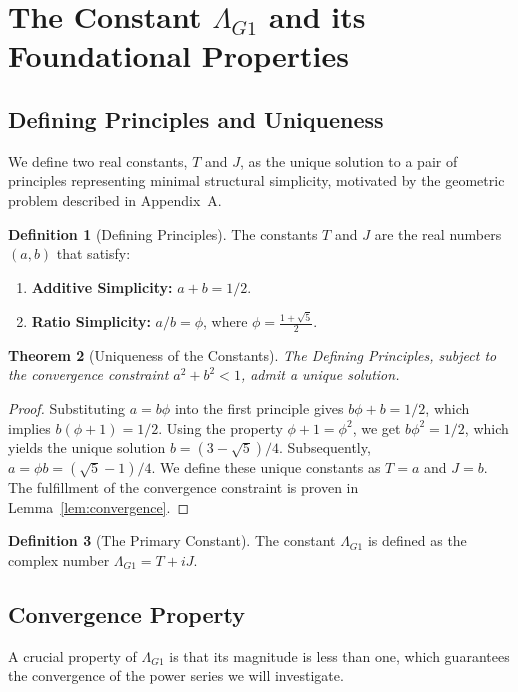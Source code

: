 \documentclass{amsart}
\theoremstyle{plain}
\newtheorem{theorem}{Theorem}[section]
\theoremstyle{definition}
\newtheorem{definition}[theorem]{Definition}
\theoremstyle{remark}
\newcommand{\LambdaG}{\Lambda_{G1}}
\begin{document}
\section{The Constant \texorpdfstring{$\Lambda_{G1}$}{Lambda\_G1} and its Foundational Properties}

\subsection{Defining Principles and Uniqueness}
We define two real constants, $T$ and $J$, as the unique solution to a pair of principles representing minimal structural simplicity, motivated by the geometric problem described in Appendix~A.

\begin{definition}[Defining Principles]
The constants $T$ and $J$ are the real numbers $(a,b)$ that satisfy:
\begin{enumerate}
    \item \textbf{Additive Simplicity:} $a+b = 1/2$.
    \item \textbf{Ratio Simplicity:} $a/b = \phi$, where $\phi = \frac{1+\sqrt{5}}{2}$.
\end{enumerate}
\end{definition}

\begin{theorem}[Uniqueness of the Constants]
The Defining Principles, subject to the convergence constraint $a^2+b^2 < 1$, admit a unique solution.
\end{theorem}
\begin{proof}
Substituting $a=b\phi$ into the first principle gives $b\phi+b=1/2$, which implies $b(\phi+1)=1/2$. Using the property $\phi+1=\phi^2$, we get $b\phi^2=1/2$, which yields the unique solution $b=(3-\sqrt{5})/4$. Subsequently, $a=\phi b = (\sqrt{5}-1)/4$. We define these unique constants as $T=a$ and $J=b$. The fulfillment of the convergence constraint is proven in Lemma~\ref{lem:convergence}.
\end{proof}

\begin{definition}[The Primary Constant]
The constant $\LambdaG$ is defined as the complex number $\LambdaG = T+iJ$.
\end{definition}

\subsection{Convergence Property}
A crucial property of $\LambdaG$ is that its magnitude is less than one, which guarantees the convergence of the power series we will investigate.
\end{document}
